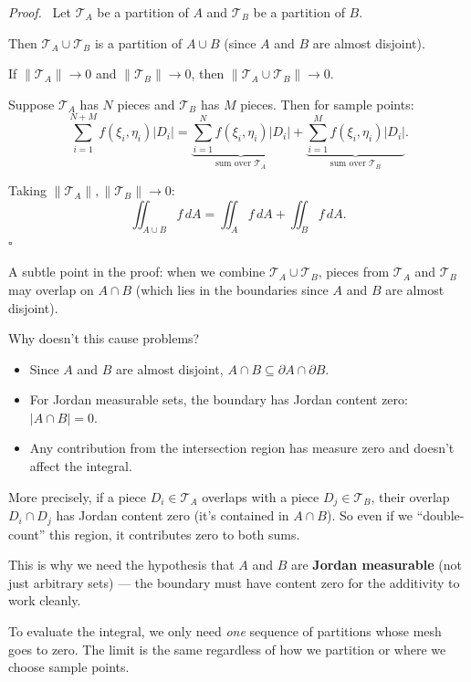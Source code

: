 \documentclass[11pt]{report}
\renewenvironment{proof}[1][Proof]{\par\noindent\textit{#1.}\ }{\hfill$\square$\par\medskip}
\begin{document}
\begin{proof}
Let $\mathcal{T}_A$ be a partition of $A$ and $\mathcal{T}_B$ be a partition of $B$.

Then $\mathcal{T}_A \cup \mathcal{T}_B$ is a partition of $A \cup B$ (since $A$ and $B$ are almost disjoint).

If $\|\mathcal{T}_A\| \to 0$ and $\|\mathcal{T}_B\| \to 0$, then $\|\mathcal{T}_A \cup \mathcal{T}_B\| \to 0$.

Suppose $\mathcal{T}_A$ has $N$ pieces and $\mathcal{T}_B$ has $M$ pieces. Then for sample points:
\[
\sum_{i=1}^{N+M} f(\xi_i, \eta_i) |D_i| = \underbrace{\sum_{i=1}^{N} f(\xi_i, \eta_i) |D_i|}_{\text{sum over } \mathcal{T}_A} + \underbrace{\sum_{i=1}^{M} f(\xi_i, \eta_i) |D_i|}_{\text{sum over } \mathcal{T}_B}.
\]

Taking $\|\mathcal{T}_A\|, \|\mathcal{T}_B\| \to 0$:
\[
\iint_{A \cup B} f \, dA = \iint_A f \, dA + \iint_B f \, dA.
\]
\end{proof}

\begin{remark}
A subtle point in the proof: when we combine $\mathcal{T}_A \cup \mathcal{T}_B$, pieces from $\mathcal{T}_A$ and $\mathcal{T}_B$ may overlap on $A \cap B$ (which lies in the boundaries since $A$ and $B$ are almost disjoint).

Why doesn't this cause problems?
\begin{itemize}
    \item Since $A$ and $B$ are almost disjoint, $A \cap B \subseteq \partial A \cap \partial B$.
    \item For Jordan measurable sets, the boundary has Jordan content zero: $|A \cap B| = 0$.
    \item Any contribution from the intersection region has measure zero and doesn't affect the integral.
\end{itemize}

More precisely, if a piece $D_i \in \mathcal{T}_A$ overlaps with a piece $D_j \in \mathcal{T}_B$, their overlap $D_i \cap D_j$ has Jordan content zero (it's contained in $A \cap B$). So even if we ``double-count'' this region, it contributes zero to both sums.

This is why we need the hypothesis that $A$ and $B$ are \textbf{Jordan measurable} (not just arbitrary sets) --- the boundary must have content zero for the additivity to work cleanly.
\end{remark}

\begin{remark}
To evaluate the integral, we only need \emph{one} sequence of partitions whose mesh goes to zero. The limit is the same regardless of how we partition or where we choose sample points.
\end{remark}
\end{document}
